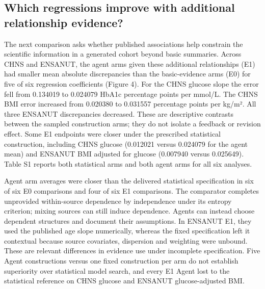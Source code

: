 \documentclass[11pt,letterpaper]{article}
\begin{document}
\subsection{Which regressions improve with additional relationship evidence?}

The next comparison asks whether published associations help constrain the scientific information in a generated cohort beyond basic summaries. Across CHNS and ENSANUT, the agent arms given these additional relationships (E1) had smaller mean absolute discrepancies than the basic-evidence arms (E0) for five of six regression coefficients (Figure 4). For the CHNS glucose slope the error fell from 0.134019 to 0.024079 HbA1c percentage points per mmol/\allowbreak{}L. The CHNS BMI error increased from 0.020380 to 0.031557 percentage points per kg/\allowbreak{}m². All three ENSANUT discrepancies decreased. These are descriptive contrasts between the sampled construction arms; they do not isolate a feedback or revision effect. Some E1 endpoints were closer under the prescribed statistical construction, including CHNS glucose (0.012021 versus 0.024079 for the agent mean) and ENSANUT BMI adjusted for glucose (0.007940 versus 0.025649). Table S1 reports both statistical arms and both agent arms for all six analyses.


Agent arm averages were closer than the delivered statistical specification in six of six E0 comparisons and four of six E1 comparisons. The comparator completes unprovided within-source dependence by independence under its entropy criterion; mixing sources can still induce dependence. Agents can instead choose dependent structures and document their assumptions. In ENSANUT E1, they used the published age slope numerically, whereas the fixed specification left it contextual because source covariates, dispersion and weighting were unbound. These are relevant differences in evidence use under incomplete specification. Five Agent constructions versus one fixed construction per arm do not establish superiority over statistical model search, and every E1 Agent lost to the statistical reference on CHNS glucose and ENSANUT glucose-adjusted BMI.
\end{document}
